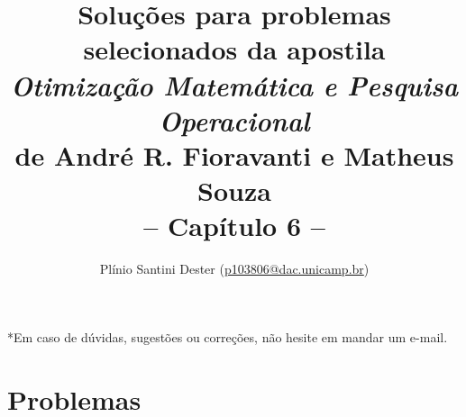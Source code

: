 


\title{	%
		{\Large Soluções para problemas selecionados da apostila\\[-0mm]
        \textit{Otimização Matemática e Pesquisa Operacional}\\[-2mm]
        de André R. Fioravanti e Matheus Souza}\\[2mm]
        -- Capítulo 6 --
}
\author{Plínio Santini Dester (\url{p103806@dac.unicamp.br})}



\maketitle

*Em caso de dúvidas, sugestões ou correções, não hesite em mandar um e-mail.

\setcounter{section}{5}
\section{Problemas}

\newpage

% 


